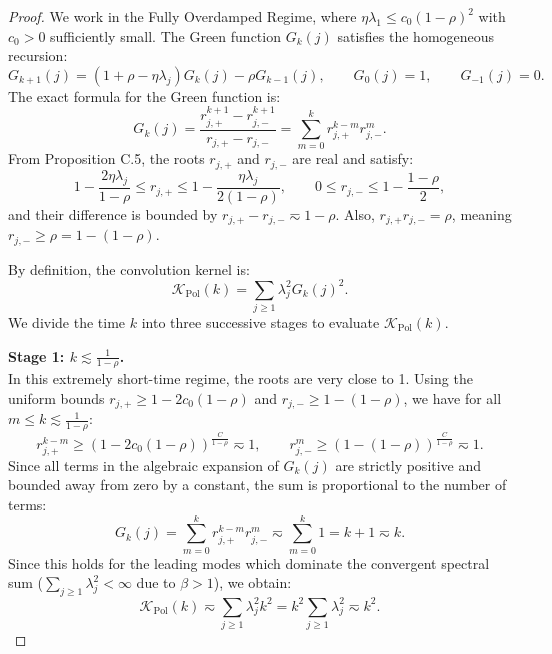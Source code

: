 \begin{proof}
We work in the Fully Overdamped Regime, where $\eta\lambda_1\le c_0(1-\rho)^2$ with $c_0>0$ sufficiently small. The Green function $G_k(j)$ satisfies the homogeneous recursion:
\[
    G_{k+1}(j)=(1+\rho-\eta\lambda_j)G_k(j)-\rho G_{k-1}(j),
    \qquad
    G_0(j)=1,
    \qquad
    G_{-1}(j)=0.
\]
The exact formula for the Green function is:
\[
    G_k(j)=\frac{r_{j,+}^{k+1}-r_{j,-}^{k+1}}{r_{j,+}-r_{j,-}} = \sum_{m=0}^{k} r_{j,+}^{k-m} r_{j,-}^m.
\]
From Proposition C.5, the roots $r_{j,+}$ and $r_{j,-}$ are real and satisfy:
\[
    1-\frac{2\eta\lambda_j}{1-\rho}
    \le r_{j,+}\le
    1-\frac{\eta\lambda_j}{2(1-\rho)},
    \qquad
    0 \le r_{j,-} \le 1-\frac{1-\rho}{2},
\]
and their difference is bounded by $r_{j,+}-r_{j,-}\eqsim 1-\rho$. Also, $r_{j,+}r_{j,-} = \rho$, meaning $r_{j,-} \ge \rho = 1-(1-\rho)$.

By definition, the convolution kernel is:
\[
    \mathcal K_{\mathrm{Pol}}(k) = \sum_{j\ge1}\lambda_j^2 G_k(j)^2.
\]
We divide the time $k$ into three successive stages to evaluate $\mathcal K_{\mathrm{Pol}}(k)$.

\textbf{Stage 1: $k \lesssim \frac{1}{1-\rho}$.} \\
In this extremely short-time regime, the roots are very close to 1. Using the uniform bounds $r_{j,+} \ge 1 - 2c_0(1-\rho)$ and $r_{j,-} \ge 1-(1-\rho)$, we have for all $m \le k \lesssim \frac{1}{1-\rho}$:
\[
    r_{j,+}^{k-m} \ge \left(1 - 2c_0(1-\rho)\right)^{\frac{C}{1-\rho}} \eqsim 1, \qquad r_{j,-}^m \ge \left(1 - (1-\rho)\right)^{\frac{C}{1-\rho}} \eqsim 1.
\]
Since all terms in the algebraic expansion of $G_k(j)$ are strictly positive and bounded away from zero by a constant, the sum is proportional to the number of terms:
\[
    G_k(j) = \sum_{m=0}^{k} r_{j,+}^{k-m} r_{j,-}^m \eqsim \sum_{m=0}^{k} 1 = k+1 \eqsim k.
\]
Since this holds for the leading modes which dominate the convergent spectral sum ($\sum_{j\ge1}\lambda_j^2 < \infty$ due to $\beta > 1$), we obtain:
\[
    \mathcal K_{\mathrm{Pol}}(k) \eqsim \sum_{j\ge1}\lambda_j^2 k^2 = k^2 \sum_{j\ge1}\lambda_j^2 \eqsim k^2.
\]


\end{proof}
